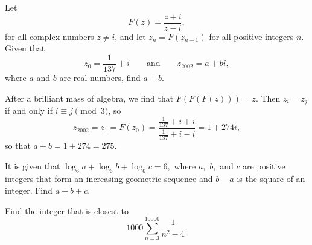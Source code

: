 \documentclass[11pt]{article}
\theoremstyle{definition}
\begin{document}
\begin{question}[name={2002 AIME I, \href{https://artofproblemsolving.com/community/c4p378395}{Problem 12}}]
	Let $$F(z)=\frac{z+i}{z-i},$$ for all complex numbers $z\not= i$, and let $z_n=F(z_{n-1})$ for all positive integers $n$. Given that $$z_0=\frac 1{137}+i \qquad \text{and} \qquad z_{2002}=a+bi,$$ where $a$ and $b$ are real numbers, find $a+b$.
\end{question}


\begin{solution}[name={Solution by paladin8}]
	After a brilliant mass of algebra, we find that $F(F(F(z))) = z$. Then $z_i = z_j$ if and only if $i \equiv j \pmod{3}$, so
	$$z_{2002} = z_1 = F(z_0) = \frac{\frac{1}{137}+i+i}{\frac{1}{137}+i-i} = 1+274i,$$
	so that $ a+b = 1+274 = \boxed{275}$.
\end{solution}







\begin{question}[name={2002 AIME II, \href{https://artofproblemsolving.com/community/c4p714626}{Problem 3}}]
	It is given that $\log_{6}a+\log_{6}b+\log_{6}c=6,$ where $a,$ $b,$ and $c$ are positive integers that form an increasing geometric sequence and $b-a$ is the square of an integer. Find $a+b+c$.
\end{question}


%	













\begin{question}[name={2002 AIME II, \href{https://artofproblemsolving.com/community/c4p714630}{Problem 6}}]
	Find the integer that is closest to $$ 1000 \sum_{n=3}^{10000}\frac{1}{n^{2}-4}.$$
\end{question}


%	
\end{document}
